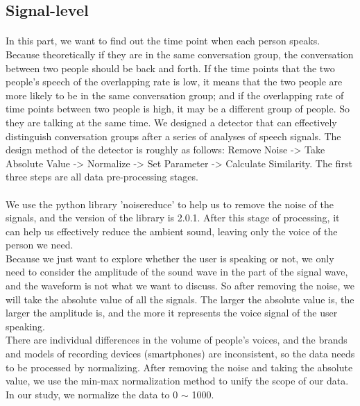 \documentclass[a4paper,12pt]{report}
\begin{document}
\subsection{Signal-level}
\paragraph{}
In this part, we want to find out the time point when each person speaks. Because theoretically if they are in the same conversation group, the conversation between two people should be back and forth. If the time points that the two people's speech of the overlapping rate is low, it means that the two people are more likely to be in the same conversation group; and if the overlapping rate of time points between two people is high, it may be a different group of people. So they are talking at the same time. We designed a detector that can effectively distinguish conversation groups after a series of analyses of speech signals. The design method of the detector is roughly as follows: Remove Noise -> Take Absolute Value -> Normalize -> Set Parameter -> Calculate Similarity. The first three steps are all data pre-processing stages.
\paragraph{}
We use the python library 'noisereduce' to help us to remove the noise of the signals, and the version of the library is 2.0.1. After this stage of processing, it can help us effectively reduce the ambient sound, leaving only the voice of the person we need.
\\
Because we just want to explore whether the user is speaking or not, we only need to consider the amplitude of the sound wave in the part of the signal wave, and the waveform is not what we want to discuss. So after removing the noise, we will take the absolute value of all the signals. The larger the absolute value is, the larger the amplitude is, and the more it represents the voice signal of the user speaking.
\\
There are individual differences in the volume of people's voices, and the brands and models of recording devices (smartphones) are inconsistent, so the data needs to be processed by normalizing. After removing the noise and taking the absolute value, we use the min-max normalization method to unify the scope of our data. In our study, we normalize the data to 0 $\sim$ 1000.
\end{document}
